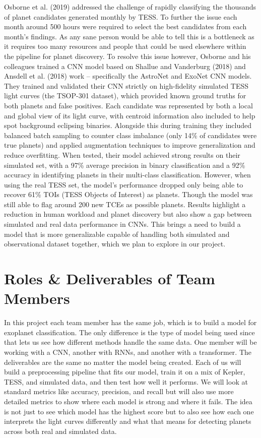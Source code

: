 \documentclass[letterpaper]{article}
\begin{document}
Osborne et al. (2019) addressed the challenge of rapidly classifying the thousands of planet candidates generated monthly by TESS. To further the issue each month around 500 hours were required to select the best candidates from each month's findings. As any sane person would be able to tell this is a bottleneck as it requires too many resources and people that could be used elsewhere within the pipeline for planet discovery. To resolve this issue however, Osborne and his colleagues trained a CNN model based on Shallue and Vanderburg (2018) and Ansdell et al. (2018) work – specifically the AstroNet and ExoNet CNN models. They trained and validated their CNN strictly on high-fidelity simulated TESS light curves (the TSOP-301 dataset), which provided known ground truths for both planets and false positives. Each candidate was represented by both a local and global view of its light curve, with centroid information also included to help spot background eclipsing binaries. Alongside this during training they included balanced batch sampling to counter class imbalance (only 14\% of candidates were true planets) and applied augmentation techniques to improve generalization and reduce overfitting. When tested, their model achieved strong results on their simulated set, with a 97\% average precision in binary classification and a 92\% accuracy in identifying planets in their multi-class classification. However, when using the real TESS set, the model’s performance dropped only being able to recover 61\% TOIs (TESS Objects of Interest) as planets. Though the model was still able to flag around 200 new TCEs as possible planets. Results highlight a reduction in human workload and planet discovery but also show a gap between simulated and real data performance in CNNs. This brings a need to build a model that is more generalizable capable of handling both simulated and observational dataset together, which we plan to explore in our project.

\section*{Roles \& Deliverables of Team Members}
In this project each team member has the same job, which is to build a model for exoplanet classification. The only difference is the type of model being used since that lets us see how different methods handle the same data. One member will be working with a CNN, another with RNNs, and another with a transformer. The deliverables are the same no matter the model being created. Each of us will build a preprocessing pipeline that fits our model, train it on a mix of Kepler, TESS, and simulated data, and then test how well it performs. We will look at standard metrics like accuracy, precision, and recall but will also use more detailed metrics to show where each model is strong and where it fails. The idea is not just to see which model has the highest score but to also see how each one interprets the light curves differently and what that means for detecting planets across both real and simulated data.
\end{document}
